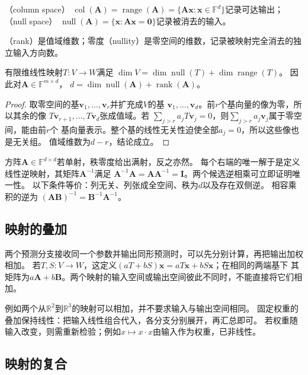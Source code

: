 （column space）
$\operatorname{col}(\bm A)=\operatorname{range}(\bm A)
=\{\bm A\bm x:\bm x\in\mathbb F^d\}$记录可达输出；
（null space）
$\operatorname{null}(\bm A)=\{\bm x:\bm A\bm x=\bm0\}$记录被消去的输入。

（rank）是值域维数；零度（nullity）是零空间的维数，记录被映射完全消去的独立输入方向数。
\begin{theorem}[秩零度定理]
\label{thm:linear-algebra-rank-nullity}
有限维线性映射$T:V\to W$满足
$\dim V=\dim\operatorname{null}(T)+\dim\operatorname{range}(T)$。
因此对$\bm A\in\mathbb F^{m\times d}$，
$d=\dim\operatorname{null}(\bm A)+\operatorname{rank}(\bm A)$。
\end{theorem}
\begin{proof}
取零空间的基$\bm v_1,\ldots,\bm v_r$并扩充成$V$的基
$\bm v_1,\ldots,\bm v_d$。前$r$个基向量的像为零，所以其余的像
$T\bm v_{r+1},\ldots,T\bm v_d$张成值域。若
$\sum_{j>r}a_jT\bm v_j=0$，则$\sum_{j>r}a_j\bm v_j$属于零空间，能由前$r$个
基向量表示。整个基的线性无关性迫使全部$a_j=0$，所以这些像也是无关组。
值域维数为$d-r$，结论成立。
\end{proof}


方阵$\bm A\in\mathbb F^{d\times d}$若单射，秩零度给出满射，反之亦然。
每个右端的唯一解于是定义线性逆映射，其矩阵$\bm A^{-1}$满足
$\bm A^{-1}\bm A=\bm A\bm A^{-1}=\bm I$。两个候选逆相乘可立即证明唯一性。
以下条件等价：列无关、列张成全空间、秩为$d$以及存在双侧逆。
相容乘积的逆为
$(\bm A\bm B)^{-1}=\bm B^{-1}\bm A^{-1}$。

\subsection{映射的叠加}
\label{sec:linear-algebra-map-addition}

两个预测分支接收同一个参数并输出同形预测时，可以先分别计算，再把输出加权相加。
若$T,S:V\to W$，这定义$(aT+bS)\bm x=aT\bm x+bS\bm x$；在相同的两端基下
其矩阵为$a\bm A+b\bm B$。两个映射的输入空间或输出空间彼此不同时，不能直接将它们相加。



例如两个从$\mathbb R^2$到$\mathbb R^3$的映射可以相加，并不要求输入与输出空间相同。
固定权重的叠加保持线性：把输入线性组合代入，各分支分别展开，再汇总即可。
若权重随输入改变，则需重新检验；例如$x\mapsto x\cdot x$由输入作为权重，已非线性。

\subsection{映射的复合}
\label{sec:linear-algebra-map-composition}

